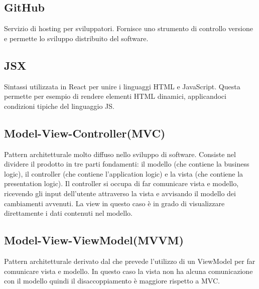 \subsection*{GitHub}
Servizio di hosting per sviluppatori. Fornisce uno strumento di controllo versione e permette lo sviluppo distribuito del software.


\subsection*{JSX}
Sintassi utilizzata in React per unire i linguaggi HTML e JavaScript. Questa permette per esempio di rendere elementi HTML dinamici, applicandoci condizioni tipiche del linguaggio JS. 
\subsection*{Model-View-Controller(MVC)}
Pattern architetturale molto diffuso nello sviluppo di software. Consiste nel dividere il prodotto in tre parti fondamenti: il modello (che contiene la business logic), il controller (che contiene l'application logic) e la vista (che contiene la presentation logic). Il controller si occupa di far comunicare vista e modello, ricevendo gli input dell'utente attraverso la vista e avvisando il modello dei cambiamenti avvenuti. La view in questo caso è in grado di visualizzare direttamente i dati contenuti nel modello.
\subsection*{Model-View-ViewModel(MVVM)}
Pattern architetturale derivato dal  che prevede l'utilizzo di un ViewModel per far comunicare vista e modello. In questo caso la vista non ha alcuna comunicazione con il modello quindi il disaccoppiamento è maggiore rispetto a MVC.

